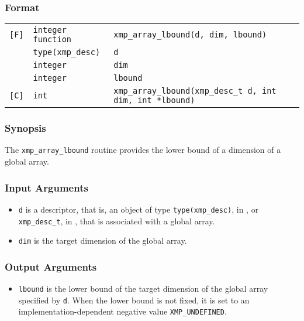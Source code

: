 \subsubsection*{Format}

\begin{tabular}{lll}

\verb![F]!& {\tt integer function}& {\tt xmp\_array\_lbound(d, dim, lbound)}\\
          & {\tt type(xmp\_desc)} & {\tt d}\\
          & {\tt integer} & {\tt dim}\\
          & {\tt integer} & {\tt lbound}\\

\verb![C]!&  {\tt int}& {\tt xmp\_array\_lbound(xmp\_desc\_t d, int dim, int *lbound)}\\

\end{tabular}

\subsubsection*{Synopsis}

The {\tt xmp\_array\_lbound} routine provides the lower bound of a
dimension of a global array. 

\subsubsection*{Input Arguments}
\begin{itemize}
 \item {\tt d} is a descriptor, that is, an object of type 
       {\tt type(xmp\_desc)}, in {\XMPF}, or {\tt xmp\_desc\_t},
       in {\XMPC}, that is associated with a global array.
 \item {\tt dim} is the target dimension of the global array.
\end{itemize}

\subsubsection*{Output Arguments}
\begin{itemize}
 \item {\tt lbound} is the lower bound of the target dimension of the
       global array specified by {\tt d}. When the lower bound is not
       fixed, it is set to an implementation-dependent negative value
       {\tt XMP\_UNDEFINED}.
\end{itemize}



